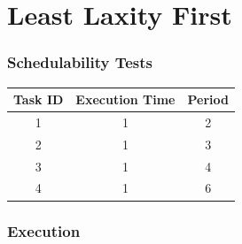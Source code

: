 \documentclass[xcolor=table]{beamer}
\begin{document}
\section{Least Laxity First}
\begin{frame}
\frametitle{Schedulability Tests}
\begin{table}[]
\begin{tabular}{|c|c|c|}
\hline
\textbf{Task ID} & \textbf{Execution Time} & \textbf{Period}\\ \hline
\cellcolor[HTML]{ECF6CE}1 &\cellcolor[HTML]{ECF6CE}1 &\cellcolor[HTML]{ECF6CE}2 \\ \hline
\cellcolor[HTML]{A4A4A4}2 &\cellcolor[HTML]{A4A4A4}1 &\cellcolor[HTML]{A4A4A4}3 \\ \hline
\cellcolor[HTML]{F781D8}3 &\cellcolor[HTML]{F781D8}1 &\cellcolor[HTML]{F781D8}4 \\ \hline
\cellcolor[HTML]{8181F7}4 &\cellcolor[HTML]{8181F7}1 &\cellcolor[HTML]{8181F7}6 \\ \hline
\end{tabular}
\end{table}
\end{frame}
\begin{frame}
\frametitle{Execution}
\begin{table}[]
\end{table}
\end{frame}
\end{document}
